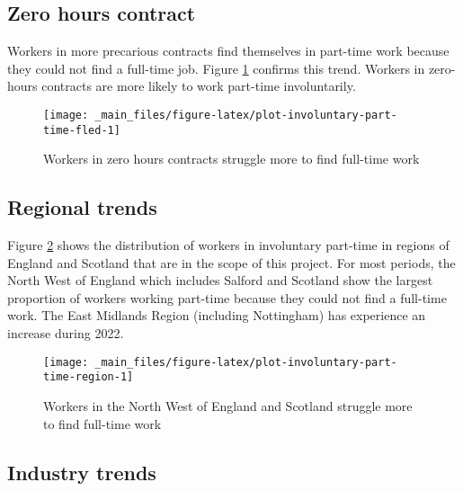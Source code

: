 \documentclass[
]{book}
\begin{document}
\hypertarget{zero-hours-contract}{%
\subsection{Zero hours contract}\label{zero-hours-contract}}

Workers in more precarious contracts find themselves in part-time work because they could not find a full-time job. Figure \ref{fig:plot-involuntary-part-time-fled} confirms this trend. Workers in zero-hours contracts are more likely to work part-time involuntarily.

\begin{figure}

{\centering \texttt{[image: \_main\_files/figure-latex/plot-involuntary-part-time-fled-1]} 

}

\caption{Workers in zero hours contracts struggle more to find full-time work}\label{fig:plot-involuntary-part-time-fled}
\end{figure}

\hypertarget{regional-trends}{%
\subsection{Regional trends}\label{regional-trends}}

Figure \ref{fig:plot-involuntary-part-time-region} shows the distribution of workers in involuntary part-time in regions of England and Scotland that are in the scope of this project. For most periods, the North West of England which includes Salford and Scotland show the largest proportion of workers working part-time because they could not find a full-time work. The East Midlands Region (including Nottingham) has experience an increase during 2022.

\begin{figure}

{\centering \texttt{[image: \_main\_files/figure-latex/plot-involuntary-part-time-region-1]} 

}

\caption{Workers in the North West of England and Scotland struggle more to find full-time work}\label{fig:plot-involuntary-part-time-region}
\end{figure}

\hypertarget{industry-trends}{%
\subsection{Industry trends}\label{industry-trends}}
\end{document}
